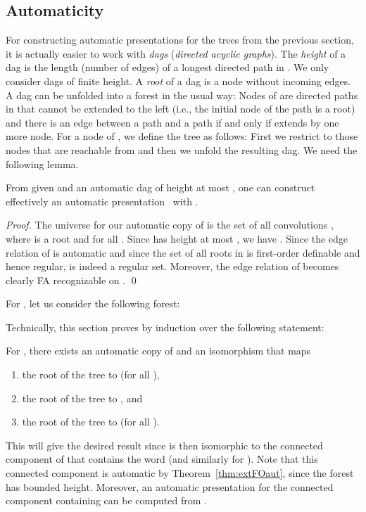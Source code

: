\documentclass[envcountsame]{llncs}
\begin{document}
\subsection{Automaticity}

For constructing automatic presentations for the trees
from the previous section, it is actually easier to work
with {\em dags} ({\em directed acyclic graphs}).
The {\em height} of a dag  is the length (number of edges)
of a longest directed path in . We only consider dags
of finite height. A {\em root} of a dag is a node without incoming edges. A dag  can be unfolded into
a forest  in the usual way:
Nodes of  are directed paths in 
that cannot be extended to the left (i.e., the initial node
of the path is a root) and there is an edge
between a path  and a path  if and only if  extends
 by one more node. For a node  of , we define
the tree  as follows: First we restrict
 to those nodes that are reachable from  and then
we unfold the resulting dag.
We need the following lemma.

\begin{lemma}\label{from dags to trees}
  From given  and an automatic dag  of height at
  most , one can construct effectively an automatic
  presentation~ with .
\end{lemma}

\begin{proof}
  The universe for our automatic copy of  is the
  set  of all convolutions , where  is a root and  for all . Since  has height at most , we have .
  Since the edge relation of  is automatic and since the set of all
  roots in  is first-order definable and hence regular,  is
  indeed a regular set.  Moreover, the edge relation of 
  becomes clearly FA recognizable on .  \qed
\end{proof}
For , let us consider the following forest:

Technically, this section proves by induction over  the following
statement:
\begin{proposition}\label{P:forest-automatic}
  For , there exists an automatic copy  of
   and an isomorphism  that maps
  \begin{enumerate}
  \item the root of the tree  to 
    (for all ),
  \item the root of the tree  to , and
  \item the root of the tree  to  (for all
    ).
  \end{enumerate}
\end{proposition}
This will give the desired result since  is then
isomorphic to the connected component of  that contains
the word  (and similarly for ).  Note
that this connected component is automatic by
Theorem~\ref{thm:extFOaut}, since the forest  has
bounded height. Moreover, an automatic presentation for 
the connected component containing  can be computed from .
\end{document}
